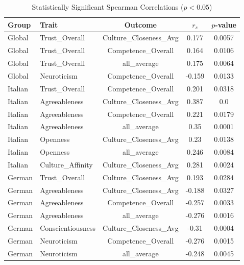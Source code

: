 \begin{table}[ht]
\centering
\caption{Statistically Significant Spearman Correlations ($p < 0.05$)}
\label{tab:meaningful_correlations}
\begin{tabular}{llccc}
\toprule
Group & Trait & Outcome & $r_s$ & $p$-value \\
\midrule
Global & Trust_Overall & Culture_Closeness_Avg & 0.177 & 0.0057 \\
Global & Trust_Overall & Competence_Overall & 0.164 & 0.0106 \\
Global & Trust_Overall & all_average & 0.175 & 0.0064 \\
Global & Neuroticism & Competence_Overall & -0.159 & 0.0133 \\
Italian & Trust_Overall & Competence_Overall & 0.201 & 0.0318 \\
Italian & Agreeableness & Culture_Closeness_Avg & 0.387 & 0.0 \\
Italian & Agreeableness & Competence_Overall & 0.221 & 0.0179 \\
Italian & Agreeableness & all_average & 0.35 & 0.0001 \\
Italian & Openness & Culture_Closeness_Avg & 0.23 & 0.0138 \\
Italian & Openness & all_average & 0.246 & 0.0084 \\
Italian & Culture_Affinity & Culture_Closeness_Avg & 0.281 & 0.0024 \\
German & Trust_Overall & Culture_Closeness_Avg & 0.193 & 0.0284 \\
German & Agreeableness & Culture_Closeness_Avg & -0.188 & 0.0327 \\
German & Agreeableness & Competence_Overall & -0.257 & 0.0033 \\
German & Agreeableness & all_average & -0.276 & 0.0016 \\
German & Conscientiousness & Culture_Closeness_Avg & -0.31 & 0.0004 \\
German & Neuroticism & Competence_Overall & -0.276 & 0.0015 \\
German & Neuroticism & all_average & -0.248 & 0.0045 \\
\bottomrule
\end{tabular}
\end{table}
